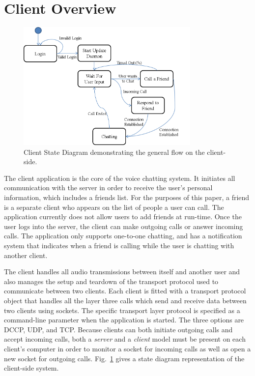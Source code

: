 
\section{Client Overview}
\label{sec:client_des}

\begin{figure}[!t]
   \centering
      \includegraphics[width=0.8\textwidth]{pics/Client_StateDiagram}
   \caption{Client State Diagram demonstrating the general flow on the client-side.}
\label{fig:client_state_diag}
\end{figure}

The client application is the core of the voice chatting system. It initiates all
communication with the server in order to receive the user's personal 
information, which includes a friends list. For the purposes of this paper, a
friend is a separate client who appears on the list of people a user can call. The application currently
does not allow users to add friends at run-time.  Once the 
user logs into the server,
the client can make outgoing calls or answer incoming calls.  The
application only supports one-to-one chatting, and has a notification system that 
indicates when a friend is calling while the user is chatting with another client.  

The client handles all audio transmissions between itself and another user
and also manages the setup and teardown of the transport protocol used to
communicate between two clients.  Each client is fitted with a transport protocol
object that handles all the layer three calls which send and receive data between
two clients using sockets.  The specific transport layer protocol is specified
as a command-line parameter when the application is started.
The three options are DCCP, UDP, and TCP. Because clients can both initiate
outgoing calls and accept incoming calls, both a \textit{server} and a
\textit{client} model must be present on each client's computer in order to
monitor a socket for incoming calls as well as open a new socket for outgoing calls.  Fig.~\ref{fig:client_state_diag} gives 
a state diagram representation of the client-side system.



